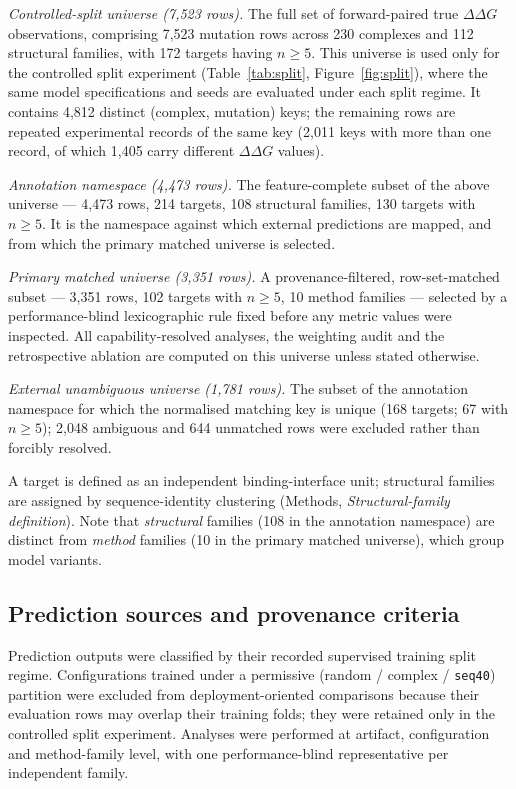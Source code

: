 \documentclass[11pt,a4paper]{article}
\begin{document}
\emph{Controlled-split universe (7{,}523 rows).} The full set of forward-paired true
$\Delta\Delta G$ observations, comprising 7{,}523 mutation rows across 230 complexes and
112 structural families, with 172 targets having $n \geq 5$. This universe is used only for
the controlled split experiment (Table~\ref{tab:split}, Figure~\ref{fig:split}), where the
same model specifications and seeds are evaluated under each split regime. It contains
4{,}812 distinct (complex, mutation) keys; the remaining rows are repeated experimental
records of the same key (2{,}011 keys with more than one record, of which 1{,}405 carry
different $\Delta\Delta G$ values).

\emph{Annotation namespace (4{,}473 rows).} The feature-complete subset of the above
universe --- 4{,}473 rows, 214 targets, 108 structural families, 130 targets with
$n \geq 5$. It is the namespace against which external predictions are mapped, and from
which the primary matched universe is selected.

\emph{Primary matched universe (3{,}351 rows).} A provenance-filtered, row-set-matched
subset --- 3{,}351 rows, 102 targets with $n \geq 5$, 10 method families --- selected by a
performance-blind lexicographic rule fixed before any metric values were inspected. All
capability-resolved analyses, the weighting audit and the retrospective ablation are
computed on this universe unless stated otherwise.

\emph{External unambiguous universe (1{,}781 rows).} The subset of the annotation namespace
for which the normalised matching key is unique (168 targets; 67 with $n \geq 5$); 2{,}048
ambiguous and 644 unmatched rows were excluded rather than forcibly resolved.

A target is defined as an independent binding-interface unit; structural families are
assigned by sequence-identity clustering (Methods, \emph{Structural-family definition}). Note
that \emph{structural} families (108 in the annotation namespace) are distinct from
\emph{method} families (10 in the primary matched universe), which group model variants.

\subsection*{Prediction sources and provenance criteria}
Prediction outputs were classified by their recorded supervised training split regime.
Configurations trained under a permissive (random / complex / \texttt{seq40}) partition were
excluded from deployment-oriented comparisons because their evaluation rows may overlap
their training folds; they were retained only in the controlled split experiment. Analyses
were performed at artifact, configuration and method-family level, with one
performance-blind representative per independent family.
\end{document}
